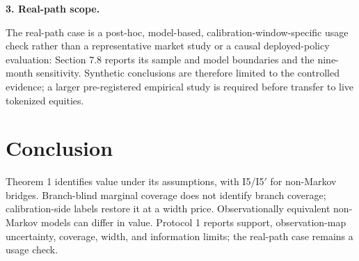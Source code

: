 \textbf{3. Real-path scope.}

The real-path case is a post-hoc, model-based, calibration-window-specific usage check rather than a representative market study or a causal deployed-policy evaluation: Section 7.8 reports its sample and model boundaries and the nine-month sensitivity. Synthetic conclusions are therefore limited to the controlled evidence; a larger pre-registered empirical study is required before transfer to live tokenized equities.



\section{Conclusion}\label{sec:conclusion}

Theorem 1 identifies value under its assumptions, with I5/I5$'$ for non-Markov bridges. Branch-blind marginal coverage does not identify branch coverage; calibration-side labels restore it at a width price. Observationally equivalent non-Markov models can differ in value. Protocol 1 reports support, observation-map uncertainty, coverage, width, and information limits; the real-path case remains a usage check.

